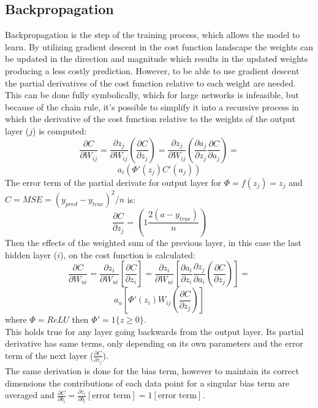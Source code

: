 \subsection{Backpropagation}
Backpropagation is the step of the training process, which allows the model to learn. By utilizing gradient descent in the cost function landscape the weights can be updated in the direction and magnitude which results in the updated weights producing a less costly prediction. However, to be able to use gradient descent the partial derivatives of the cost function relative to each weight are needed. This can be done fully symbolically, which for large networks is infeasible, but because of the chain rule, it's possible to simplify it into a recursive process in which the derivative of the cost function relative to the weights of the output layer ($j$) is computed:
$$
\frac{\partial C}{\partial W_{ij}} = 
\frac{\partial z_j}{\partial W_{ij}} (\frac{\partial C}{\partial z_j})= 
\frac{\partial z_j}{\partial W_{ij}}  (\frac{\partial a_j}{\partial z_j} \frac{\partial C}{\partial a_j}) =
$$
$$
a_i (\Phi'(z_j) C'(a_j))
$$
The error term of the partial derivate for output layer for $\Phi = f(z_j)=z_j$ and $C=MSE=(y_{pred}-y_{true})^2/n$ is:
$$
\frac{\partial C}{\partial z_j} = (1\frac{2(a-y_{true})}{n})
$$
Then the effects of the weighted sum of the previous layer, in this case the last hidden layer ($i$), on the cost function is calculated:
$$
\frac{\partial C}{\partial W_{ui}} =
\frac{\partial z_i}{\partial W_{ui}} [\frac{\partial C}{\partial z_i}] = 
\frac{\partial z_i}{\partial W_{ui}} [\frac{\partial a_i}{\partial z_i} \frac{\partial z_j}{\partial a_i} (\frac{\partial C}{\partial z_j})] =
$$
$$
a_u [\Phi'(z_i) W_{ij} (\frac{\partial C}{\partial z_j})]
$$
where $\Phi = ReLU$ then $\Phi'=1\{z \geq 0\}$.\\
This holds true for any layer going backwards from the output layer. Its partial derivative has same terms, only depending on its own parameters and the error term of the next layer ($\frac{\partial C}{\partial z_j}$).\\
The same derivation is done for the bias term, however to maintain its correct dimensions the contributions of each data point for a singular bias term are averaged and $\frac{\partial C}{\partial b_{i}} =
\frac{\partial z_i}{\partial b_{i}} [\text{error term}] = 1[\text{error term}]$.
